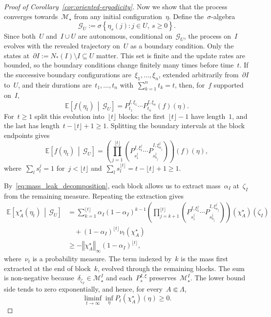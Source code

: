 \documentclass[EJP,preprint,NODS,nobera]{ejpecp}
\newcommand{\E}{\mathbb{E}}
\newcommand{\CE}[2]{\E\Cb{#1\,\middle|\,#2}}
\newcommand{\bb}[1]{\left(#1\right)}
\newcommand{\Cb}[1]{\left[#1\right]}
\newcommand{\cb}[1]{\left\{#1\right\}}
\newcommand{\norm}[1]{\left\Vert#1\right\Vert}
\begin{document}
\begin{proof}[Proof of Corollary~\ref{cor:oriented-ergodicity}]
Now we show that the process converges towards~$\mathcal{M}_\star$ from any initial configuration~$\eta$. Define the~$\sigma$-algebra 
\begin{equation*}
\mathcal G_U:=\sigma\cb{\eta_s(j):j\in U,\ s\geq0}.
\end{equation*}
Since both~$U$ and~$I\cup U$ are autonomous,
conditional on~$\mathcal G_U$, the process on~$I$ evolves with
the revealed trajectory on~$U$ as a boundary condition. Only the states at~$\partial I:=N_*(I)\setminus I\subseteq U$ matter.
This set is finite and the update rates are bounded, so the boundary conditions change finitely many times before time~$t$. 
If the successive boundary configurations are~$\xi_1,\ldots,\xi_n$,
extended arbitrarily from~$\partial I$ to~$U$, and their durations
are~$t_1,\ldots,t_n$ with~$\sum_{k=1}^n t_k=t$, then, for~$f$ supported on~$I$,
\begin{equation*}
\CE{f(\eta_t)}{\mathcal G_U}
=P_{t_1}^{I,\xi_1}\cdots P_{t_n}^{I,\xi_n}(f)(\eta).
\end{equation*}
For~$t\geq1$ split this evolution into~${\lfloor t\rfloor}$
blocks: the first~${\lfloor t\rfloor}-1$ have length~$1$, and the last has length~$t-{\lfloor t\rfloor}+1\geq 1$.
Splitting the boundary intervals at the block endpoints gives
\begin{equation*}
\CE{f(\eta_t)}{\mathcal G_U}
=\bb{\prod_{j=1}^{{\lfloor t\rfloor}}
 \bb{P_{s_1^j}^{I,\xi_1^j}\cdots
     P_{s_{n_j}^j}^{I,\xi_{n_j}^j}}}(f)(\eta),
\end{equation*}
where~$\sum_l s_l^j=1$ for~$j<{\lfloor t\rfloor}$ and~$\sum_l s_l^{\lfloor t\rfloor}=t-{\lfloor t\rfloor}+1\geq1$.

By~\eqref{eq:mass_leak_decomposition}, each block allows us to extract
mass~$\alpha_I$ at~$\zeta_I$ from the remaining measure.
Repeating the extraction gives
\begin{align*}
\CE{\chi_A^\star(\eta_t)}{\mathcal G_U}
&=\sum_{k=1}^{{\lfloor t\rfloor}} \alpha_I(1-\alpha_I)^{k-1}
 \bb{\prod_{j=k+1}^{{\lfloor t\rfloor}}
  \bb{P_{s_1^j}^{I,\xi_1^j}\cdots
      P_{s_{n_j}^j}^{I,\xi_{n_j}^j}}}(\chi_A^\star)(\zeta_I)\\
&\quad +(1-\alpha_I)^{\lfloor t\rfloor}\nu_t(\chi_A^\star)\\
&\geq-\norm{\chi_A^\star}_\infty(1-\alpha_I)^{\lfloor t\rfloor},
\end{align*}
where~$\nu_t$ is a probability measure.
The term indexed by~$k$ is the mass first extracted at the end of
block~$k$, evolved through the remaining blocks.
The sum is non-negative because~$\delta_{\zeta_I}\in\mathcal M_\star^I$
and each~$P_s^{I,\xi}$ preserves~$\mathcal M_\star^I$.
The lower bound side tends to zero exponentially,
and hence, for every~$A\Subset\Lambda$,
\begin{equation}\label{eq:convergence-towards-m-star}
\liminf_{t\to\infty}\inf_\eta P_t(\chi_A^\star)(\eta)\geq0.
\end{equation}


\end{proof}
\end{document}
